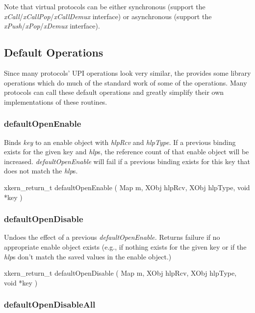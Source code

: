 Note that virtual protocols can be either synchronous (support the
{\em xCall}/{\em xCallPop}/{\em xCallDemux} interface) or asynchronous
(support the {\em xPush}/{\em xPop}/{\em xDemux} interface).


\subsection{Default Operations}

Since many protocols' UPI operations look very similar, the \xk{}
provides some library operations which do much of the standard work of
some of the operations.  Many protocols can call these default
operations and greatly simplify their own implementations of these
routines.  


\subsubsection{defaultOpenEnable}

Binds {\em key} to an enable object with {\em hlpRcv} and {\em
hlpType}.  If a previous binding exists for the given key and {\em hlp}s,
the reference count of that enable object will be increased.  
{\em defaultOpenEnable} will fail if a previous binding exists for
this key that does not match the {\em hlp}s.

\medskip

{\sem xkern\_return\_t} {\bold defaultOpenEnable} 
( 
{\sem Map} {\caps m}, 
{\sem XObj} {\caps hlpRcv}, 
{\sem XObj} {\caps hlpType}, 
{\sem void} *{\caps key}
)


\subsubsection{defaultOpenDisable}

Undoes the effect of a previous {\em defaultOpenEnable.}
Returns failure if no appropriate enable object exists (e.g., if
nothing exists for the given key or if the {\em hlp}s don't match the
saved values in the enable object.)

\medskip

{\sem xkern\_return\_t} {\bold defaultOpenDisable} 
( 
{\sem Map} {\caps m}, 
{\sem XObj} {\caps hlpRcv}, 
{\sem XObj} {\caps hlpType}, 
{\sem void} *{\caps key}
)


\subsubsection{defaultOpenDisableAll}

